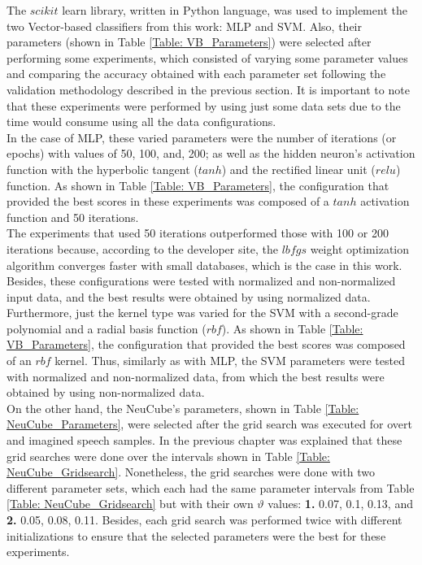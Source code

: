 The $scikit$ learn library, written in Python language, was used to implement the two Vector-based classifiers from this work: MLP and SVM. Also, their parameters (shown in Table \ref{Table: VB_Parameters}) were selected after performing some experiments, which consisted of varying some parameter values and comparing the accuracy obtained with each parameter set following the validation methodology described in the previous section. It is important to note that these experiments were performed by using just some data sets due to the time would consume using all the data configurations.\\

In the case of MLP, these varied parameters were the number of iterations (or epochs) with values of 50, 100, and, 200; as well as the hidden neuron's activation function with the hyperbolic tangent ($tanh$) and the rectified linear unit ($relu$) function. As shown in Table \ref{Table: VB_Parameters}, the configuration that provided the best scores in these experiments was composed of a $tanh$ activation function and 50 iterations.\\

The experiments that used 50 iterations outperformed those with 100 or 200 iterations because, according to the developer site, the $lbfgs$ weight optimization algorithm converges faster with small databases, which is the case in this work. Besides, these configurations were tested with normalized and non-normalized input data, and the best results were obtained by using normalized data.\\

Furthermore, just the kernel type was varied for the SVM with a second-grade polynomial and a radial basis function ($rbf$). As shown in Table \ref{Table: VB_Parameters}, the configuration that provided the best scores was composed of an $rbf$ kernel. Thus, similarly as with MLP, the SVM parameters were tested with normalized and non-normalized data, from which the best results were obtained by using non-normalized data.\\

On the other hand, the NeuCube's parameters, shown in Table \ref{Table: NeuCube_Parameters}, were selected after the grid search was executed for overt and imagined speech samples. In the previous chapter was explained that these grid searches were done over the intervals shown in Table \ref{Table: NeuCube_Gridsearch}. Nonetheless, the grid searches were done with two different parameter sets, which each had the same parameter intervals from Table \ref{Table: NeuCube_Gridsearch} but with their own $\vartheta$ values: \textbf{1.} {0.07, 0.1, 0.13}, and \textbf{2.} {0.05, 0.08, 0.11}. Besides, each grid search was performed twice with different initializations to ensure that the selected parameters were the best for these experiments.\\


